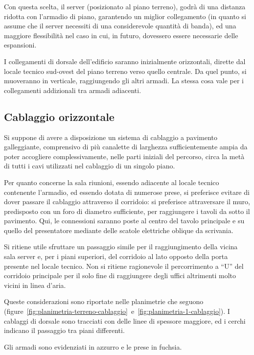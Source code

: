 Con questa scelta, il server (posizionato al piano terreno), godrà di una distanza ridotta con l'armadio di piano, garantendo
un miglior collegamento (in quanto si assume che il server necessiti di una considerevole quantità di banda), ed una maggiore
flessibilità nel caso in cui, in futuro, dovessero essere necessarie delle espansioni.

I collegamenti di dorsale dell'edificio saranno inizialmente orizzontali, dirette dal locale tecnico sud-ovest del piano terreno
verso quello centrale. Da quel punto, si muoveranno in verticale, raggiungendo gli altri armadi. La stessa cosa vale per i collegamenti
addizionali tra armadi adiacenti.

\subsection{Cablaggio orizzontale}

Si suppone di avere a disposizione un sistema di cablaggio a pavimento galleggiante, comprensivo di più canalette di larghezza sufficientemente
ampia da poter accogliere complessivamente, nelle parti iniziali del percorso, circa la metà di tutti i cavi utilizzati nel cablaggio di un singolo piano.

Per quanto concerne la sala riunioni, essendo adiacente al locale tecnico contenente l'armadio, ed essendo dotata di numerose prese,
si preferisce evitare di dover passare il cablaggio attraverso il corridoio: si preferisce attraversare il muro, predisposto con
un foro di diametro sufficiente, per raggiungere i tavoli da sotto il pavimento. Qui, le connessioni saranno poste al centro del tavolo principale
e su quello del presentatore mediante delle scatole elettriche oblique da scrivania.

Si ritiene utile sfruttare un passaggio simile per il raggiungimento della vicina sala server e, per i piani superiori,
del corridoio al lato opposto della porta presente nel locale tecnico. Non si ritiene ragionevole il percorrimento a ``U'' del corridoio
principale per il solo fine di raggiungere degli uffici altrimenti molto vicini in linea d'aria.

Queste considerazioni sono riportate nelle planimetrie che seguono (figure~\ref{fig:planimetria-terreno-cablaggio}~e~\ref{fig:planimetria-1-cablaggio}). I cablaggi di dorsale sono tracciati con delle linee
di spessore maggiore, ed i cerchi indicano il passaggio tra piani differenti.

Gli armadi sono evidenziati in azzurro e le prese in fuchsia.

